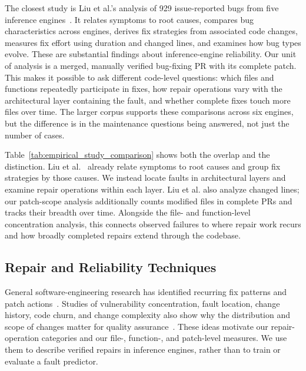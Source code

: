 The closest study is Liu et al.'s analysis of 929 issue-reported bugs from five inference engines~\cite{liu2026firstlook}. It relates symptoms to root causes, compares bug characteristics across engines, derives fix strategies from associated code changes, measures fix effort using duration and changed lines, and examines how bug types evolve. These are substantial findings about inference-engine reliability. Our unit of analysis is a merged, manually verified bug-fixing PR with its complete patch. This makes it possible to ask different code-level questions: which files and functions repeatedly participate in fixes, how repair operations vary with the architectural layer containing the fault, and whether complete fixes touch more files over time. The larger corpus supports these comparisons across six engines, but the difference is in the maintenance questions being answered, not just the number of cases.



Table~\ref{tab:empirical_study_comparison} shows both the overlap and the distinction. Liu et al.~\cite{liu2026firstlook} already relate symptoms to root causes and group fix strategies by those causes. We instead locate faults in architectural layers and examine repair operations within each layer. Liu et al. also analyze changed lines; our patch-scope analysis additionally counts modified files in complete PRs and tracks their breadth over time. Alongside the file- and function-level concentration analysis, this connects observed failures to where repair work recurs and how broadly completed repairs extend through the codebase.

\subsection{Repair and Reliability Techniques}

General software-engineering research has identified recurring fix patterns and patch actions~\cite{pan2009bugfixpatterns,sobreira2018dissection,zhong2015realbugfixes}. Studies of vulnerability concentration, fault location, change history, code churn, and change complexity also show why the distribution and scope of changes matter for quality assurance~\cite{liu2020vulnerabilitydistribution,ostrand2005faultlocation,graves2000changehistory,nagappan2005codechurn,hassan2009changecomplexity,kamei2013jitqa}. These ideas motivate our repair-operation categories and our file-, function-, and patch-level measures. We use them to describe verified repairs in inference engines, rather than to train or evaluate a fault predictor.

